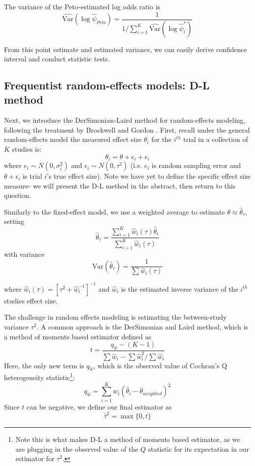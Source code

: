 \documentclass[fleqn,10pt]{SelfArx} %
\begin{document}
The variance of the Peto-estimated log odds ratio is
\[\widehat{\textrm{Var}} (\log \hat{\psi}_{Peto}) = \frac{1}{{1}/{\sum_{i = 1}^K \widehat{\textrm{Var}}( \log \hat{\psi}_i^*)}}\]

From this point estimate and estimated variance, we can easily derive confidence interval and conduct statistic tests. 

\subsection*{Frequentist random-effects models: D-L method}

Next, we introduce the DerSimonian-Laird method for random-effects modeling, following the treatment by Brockwell and Gordon \cite{BG}. First, recall under the general random-effects model the measured effect size $\theta_i$ for the $i^{th}$ trial in a collection of $K$ studies is:
\[\theta_i  = \theta + \epsilon_i + e_i\]
where $e_i \sim N(0, \sigma_i^2)$ and $\epsilon_i \sim N(0, \tau^2)$ (i.e. $e_i$ is random sampling error and $\theta + \epsilon_i$ is trial $i$'s true effect size). Note we have yet to define the specific effect size measure- we will present the D-L method in the abstract, then return to this question. 

Similarly to the fixed-effect model, we use a weighted average to estimate $\theta \approx \hat{\theta}_{\tau}$, setting
\[\hat{\theta}_\tau =  \frac{\sum_{i = 1}^K \hat{w}_i(\tau) \hat{\theta}_i }{\sum_{i = 1}^K \hat{w}_i(\tau)}\]
with variance
\[\textrm{Var}(\hat{\theta}_\tau) = \frac{1}{\sum\hat{w}_i(\tau)}\]

where $\hat{w}_i(\tau) = [\tau^2 + \hat{w}_i^{-1}]^{-1}$ and $\hat{w}_i$ is the estimated inverse variance of the $i^{th}$ studies effect size.

The challenge in random effects modeling is estimating the between-study variance $\tau^2$. A common approach is the DerSimonian and Laird method, which is a method of moments based estimator defined as 
\[t = \frac{q_{\hat{w}} - (K - 1)}{\sum \hat{w}_i - \sum \hat{w}_i^2/ \sum \hat{w}_i}\]
Here, the only new term is $q_{\hat{w}}$, which is the observed value of Cochran's Q heterogeneity statistic\footnote{Note this is what makes D-L a method of moments based estimator, as we are plugging in the observed value of the $Q$ statistic for its expectation in our estimator for $\tau^2$.}\cite{HTDA}:
\[q_{\hat{w}} = \sum_{i = 1}^K w_i (\hat{\theta}_i - \bar{\theta}_{weighted})^2\]
Since $t$ can be negative, we define our final estimator as
\[\hat{\tau}^2 = \max \{0, t\}\]
\end{document}
